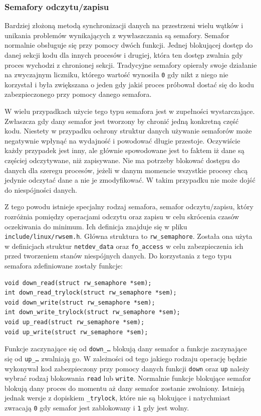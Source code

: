 \documentclass[11pt]{scrartcl}
\begin{document}
\subsubsection{Semafory odczytu/zapisu}

Bardziej złożoną metodą synchronizacji danych na przestrzeni wielu wątków i unikania problemów wynikających z wywłaszczania są semafory.  Semafor normalnie obsługuje się przy pomocy dwóch funkcji. Jednej blokującej dostęp do danej sekcji kodu dla innych procesów i drugiej, która ten dostęp zwalnia gdy proces wychodzi z chronionej sekcji.  Tradycyjne semafory opierały swoje działanie na zwyczajnym liczniku, którego wartość wynosiła \texttt{0} gdy nikt z niego nie korzystał i była zwiększana o jeden gdy jakiś proces próbował dostać się do kodu zabezpieczonego przy pomocy danego semafora.

W wielu przypadkach użycie tego typu semafora jest w zupełności wystarczające. Zwłaszcza gdy dany semafor jest tworzony by chronić jedną konkretną część kodu. Niestety w przypadku ochrony struktur danych używanie semaforów może negatywnie wpłynąć na wydajność i powodować długie przestoje. Oczywiście każdy przypadek jest inny, ale głównie spowodowane jest to faktem iż dane są częściej odczytywane, niż zapisywane. Nie ma potrzeby blokować dostępu do danych dla szeregu procesów, jeżeli w danym momencie wszystkie procesy chcą jedynie odczytać dane a nie je zmodyfikować. W takim przypadku nie może dojść do niespójności danych.

Z tego powodu istnieje specjalny rodzaj semafora, semafor odczytu/zapisu, który rozróżnia pomiędzy operacjami odczytu oraz zapisu w celu skrócenia czasów oczekiwania do minimum. Ich definicja znajduje się w pliku \texttt{include/linux/rwsem.h}. Główna struktura to \texttt{rw\_semaphore}. Została ona użyta w definicjach struktur \texttt{netdev\_data} oraz \texttt{fo\_access} w celu zabezpieczenia ich przed tworzeniem stanów niespójnych danych. Do korzystania z tego typu semafora zdefiniowane zostały funkcje:

\begin{verbatim}
void down_read(struct rw_semaphore *sem);
int down_read_trylock(struct rw_semaphore *sem);
void down_write(struct rw_semaphore *sem);
int down_write_trylock(struct rw_semaphore *sem);
void up_read(struct rw_semaphore *sem);
void up_write(struct rw_semaphore *sem);
\end{verbatim}

Funkcje zaczynające się od \texttt{down\_\ldots} blokują dany semafor a funkcje zaczynające się od \texttt{up\_\ldots} zwalniają go. W zależności od tego jakiego rodzaju operację będzie wykonywał kod zabezpieczony przy pomocy danych funkcji \texttt{down} oraz \texttt{up} należy wybrać rodzaj blokowania \texttt{read} lub \texttt{write}. Normalnie funkcje blokujące semafor blokują dany proces do momentu aż dany semafor zostanie zwolniony. Istnieją jednak wersje z dopiskiem \texttt{\_trylock}, które nie są blokujące i natychmiast zwracają \texttt{0} gdy semafor jest zablokowany i \texttt{1} gdy jest wolny.
\end{document}
